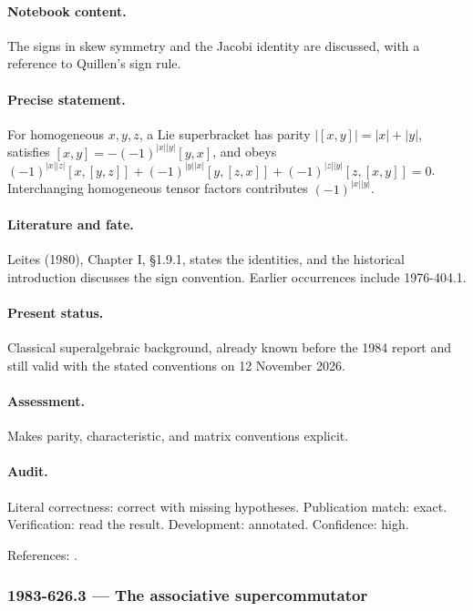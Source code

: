 \paragraph{Notebook content.} The signs in skew symmetry and the Jacobi identity are discussed, with a reference to Quillen’s sign rule.

\paragraph{Precise statement.} For homogeneous \(x,y,z\), a Lie superbracket has parity \(|[x,y]|=|x|+|y|\), satisfies \([x,y]=-(-1)^{|x||y|}[y,x]\), and obeys \((-1)^{|x||z|}[x,[y,z]]+(-1)^{|y||x|}[y,[z,x]]+(-1)^{|z||y|}[z,[x,y]]=0\). Interchanging homogeneous tensor factors contributes \((-1)^{|x||y|}\).

\paragraph{Literature and fate.} Leites (1980), Chapter I, \S1.9.1, states the identities, and the historical introduction discusses the sign convention. Earlier occurrences include 1976-404.1.

\paragraph{Present status.} Classical superalgebraic background, already known before the 1984 report and still valid with the stated conventions on 12 November 2026.

\paragraph{Assessment.} Makes parity, characteristic, and matrix conventions explicit.

\paragraph{Audit.} Literal correctness: correct with missing hypotheses. Publication match: exact. Verification: read the result. Development: annotated. Confidence: high.

\noindent References: \citep{leites1980introduction}.\par

\subsubsection{1983-626.3 --- The associative supercommutator}

